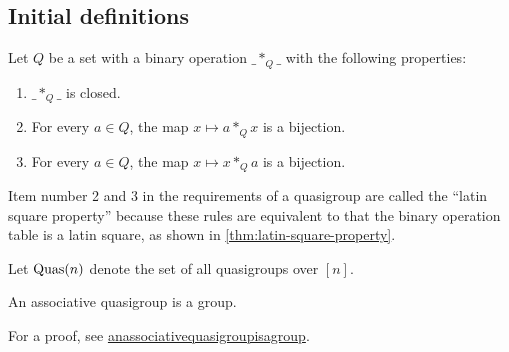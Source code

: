 \subsection{Initial definitions}

\begin{definition}
    Let \( Q \) be a set with a binary operation \( \_ *_Q \_ \) with the following properties:
    \begin{enumerate}
        \item \( \_ *_Q \_ \) is closed.
        \item For every \( a \in Q \), the map \( x \mapsto a *_Q x \) is a bijection.
        \item For every \( a \in Q \), the map \( x \mapsto x *_Q a \) is a bijection.
    \end{enumerate}
\end{definition}

\begin{remark}
    Item number 2 and 3 in the requirements of a quasigroup are called the ``latin square property'' because these rules are equivalent to that the binary operation table is a latin square, as shown in \autoref{thm:latin-square-property}.
\end{remark}

\begin{definition}
    Let \( \operatorname{Quas}(n) \) denote the set of all quasigroups over \( [n] \).
\end{definition}

\begin{theorem} \label{thm:associative-quasigroup-group}
    An associative quasigroup is a group.
\end{theorem}
For a proof, see \href{https://www.planetmath.org/anassociativequasigroupisagroup}{anassociativequasigroupisagroup}.

